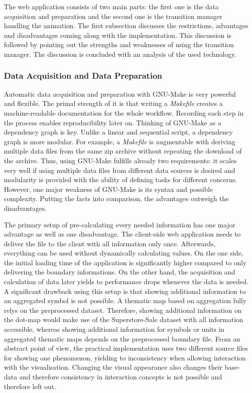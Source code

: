 The web application consists of two main parts: the first one is the data acquisition and preparation and the second one is the transition manager handling the animation. The first subsection discusses the restrictions, advantages and disadvantages coming along with the implementation. This discussion is followed by pointing out the strengths and weaknesses of using the transition manager. The discussion is concluded with an analysis of the used technology.

\subsubsection{Data Acquisition and Data Preparation}
Automatic data acquisition and preparation with GNU-Make is very powerful and flexible. The primal strength of it is that writing a \textit{Makefile} creates a machine-readable documentation for the whole workflow. Recording each step in the process enables reproducibility later on.
Thinking of GNU-Make as a dependency graph is key. Unlike a linear and sequential script, a dependency graph is more modular. For example, a \textit{Makefile} is augmentable with deriving multiple data files from the same zip archive without repeating the download of the archive. Thus, using GNU-Make fulfills already two requirements: it scales very well if using multiple data files from different data sources is desired and modularity is provided with the ability of defining tasks for different concerns. However, one major weakness of GNU-Make is its syntax and possible complexity. Putting the facts into comparison, the advantages outweigh the disadvantages.

The primary setup of pre-calculating every needed information has one major advantage as well as one disadvantage. The client-side web application needs to deliver the file to the client with all information only once. Afterwards, everything can be used without dynamically calculating values. On the one side, the initial loading time of the application is significantly higher compared to only delivering the boundary informations. On the other hand, the acquisition and calculation of data later yields to performance drops whenever the data is needed.
A significant drawback using this setup is that showing additional information to an aggregated symbol is not possible. A thematic map based on aggregation fully relys on the preprocessed dataset. Therefore, showing additional information on the dot-map would make use of the Superstore-Sale dataset with all information accessible, whereas showing additional information for symbols or units in aggregated thematic maps depends on the preprocessed boundary file. From an abstract point of view, the practical implementation uses two different source files for showing one phenomenon, yielding to inconsistency when allowing interaction with the visualisation. Changing the visual appearance also changes their base-data and therefore consistency in interaction concepts is not possible and therefore left out.

